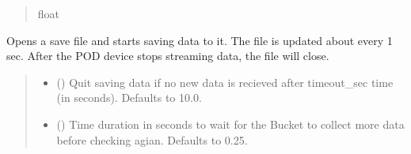 \documentclass[letterpaper,10pt,english]{sphinxmanual}
\begin{document}
\begin{fulllineitems}
\begin{fulllineitems}
\begin{quote}
\begin{description}
\sphinxAtStartPar
float

\end{description}\end{quote}

\end{fulllineitems}


\begin{fulllineitems}
\label{\detokenize{Morelia.Stream.Collect:Morelia.Stream.Collect.DrainBucketToFile.DrainBucket._ThreadedDrainBucketToFile}}
\pysigstartsignatures
{}
\pysigstopsignatures
\sphinxAtStartPar
Opens a save file and starts saving data to it. The file is updated about every 1 sec.         After the POD device stops streaming data, the file will close.
\begin{quote}\begin{description}
\begin{itemize}
\item {} 
\sphinxAtStartPar
{} (\sphinxstyleliteralemphasis{\sphinxupquote{, }}) \textendash{} Quit saving data if no new data is recieved                 after timeout\_sec time (in seconds). Defaults to 10.0.

\item {} 
\sphinxAtStartPar
{} (\sphinxstyleliteralemphasis{\sphinxupquote{, }}) \textendash{} Time duration in seconds to wait for the Bucket to                 collect more data before checking agian. Defaults to 0.25.

\end{itemize}

\end{description}\end{quote}

\end{fulllineitems}


\end{fulllineitems}
\end{document}
